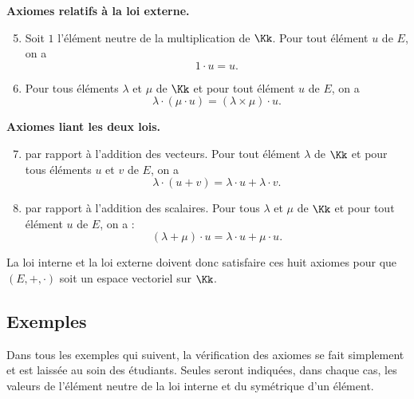 \documentclass[class=report,crop=false]{standalone}
\begin{document}
\bigskip
\textbf{Axiomes relatifs à la loi externe.}

 \begin{enumerate}  \setcounter{enumi}{4}
 \item Soit $1$ l'élément neutre de la multiplication de $\Kk$. Pour tout élément $u$ de $E$, on a
 $$1 \cdot u=u.$$

 \item Pour tous éléments $\lambda$ et $\mu$ de $\Kk$ et pour tout élément $u$ de $E$, on a
 $$\lambda \cdot (\mu \cdot u) = (\lambda \times \mu )\cdot u.$$
 \end{enumerate}

\bigskip
\textbf{Axiomes liant les deux lois.}

 \begin{enumerate}  \setcounter{enumi}{6}
 \item {} par rapport à l'addition des vecteurs.
 Pour tout élément  $\lambda$ de $\Kk$ et pour tous éléments $u$ et $v$ de $E$, on a
 $$\lambda \cdot (u+v) =\lambda \cdot u + \lambda \cdot v.$$


 \item {} par rapport à l'addition des scalaires. Pour tous $\lambda$ et $\mu$ de $\Kk$  et
pour tout élément $u$ de $E$, on a :
$$(\lambda + \mu ) \cdot u=\lambda \cdot u + \mu \cdot u .$$

 \end{enumerate}


 La loi interne et la loi externe doivent donc satisfaire ces huit axiomes pour que $(E,+, \cdot)$
 soit un espace vectoriel sur $\Kk$.




\subsection{Exemples}

  Dans tous les exemples qui suivent, la vérification des axiomes se fait
  simplement et est laissée au soin des étudiants. Seules seront indiquées,
  dans chaque cas, les valeurs de l'élément neutre de la loi interne et
  du symétrique d'un élément.
%
\end{document}
